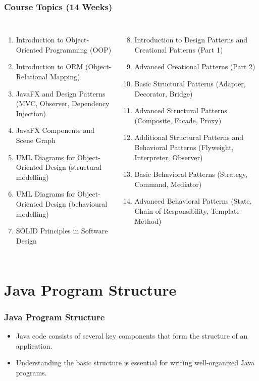 \documentclass[aspectratio=169, table]{beamer}
\begin{document}
\begin{frame}[fragile]
	\frametitle{Course Topics (14 Weeks)}
	
	\begin{columns}[t]
		\footnotesize
		\begin{enumerate}
			\item Introduction to Object-Oriented Programming (OOP)
			\item Introduction to ORM (Object-Relational Mapping)
			\item JavaFX and Design Patterns (MVC, Observer, Dependency Injection)
			\item JavaFX Components and Scene Graph
			\item UML Diagrams for Object-Oriented Design (structural modelling)
			\item UML Diagrams for Object-Oriented Design (behavioural modelling)
			\item SOLID Principles in Software Design
		\end{enumerate}
		
		\footnotesize
		\begin{enumerate}
			\setcounter{enumi}{7}
			\item Introduction to Design Patterns and Creational Patterns (Part 1)
			\item Advanced Creational Patterns (Part 2)
			\item Basic Structural Patterns (Adapter, Decorator, Bridge)
			\item Advanced Structural Patterns (Composite, Facade, Proxy)
			\item Additional Structural Patterns and Behavioral Patterns (Flyweight, Interpreter, Observer)
			\item Basic Behavioral Patterns (Strategy, Command, Mediator)
			\item Advanced Behavioral Patterns (State, Chain of Responsibility, Template Method)
		\end{enumerate}
	\end{columns}
\end{frame}

\section{Java Program Structure}

\begin{frame}[fragile]
	\frametitle{Java Program Structure}
	
	\begin{itemize}
		\item Java code consists of several key components that form the structure of an application.
		\item Understanding the basic structure is essential for writing well-organized Java programs.
	\end{itemize}
\end{frame}
\end{document}
